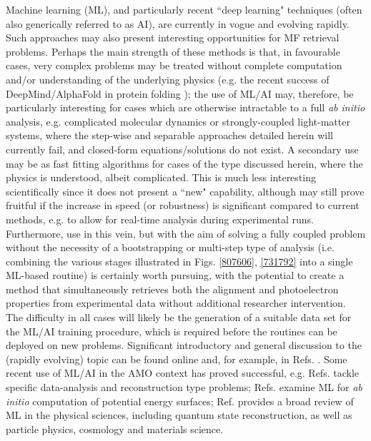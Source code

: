 \documentclass[10pt]{article}
\begin{document}
Machine learning (ML), and particularly recent ``deep learning" techniques (often also generically referred to as AI), are currently in vogue and evolving rapidly. Such approaches may also present interesting opportunities for MF retrieval problems. Perhaps the main strength of these methods is that, in favourable cases, very complex problems may be treated without complete computation and/or understanding of the underlying physics (e.g. the recent success of DeepMind/AlphaFold in protein folding \cite{eisenstein2021ArtificialIntelligencePowers,jumper2021HighlyAccurateProtein}); the use of ML/AI may, therefore, be particularly interesting for cases which are otherwise intractable to a full \textit{ab initio} analysis, e.g. complicated molecular dynamics or strongly-coupled light-matter systems, where the step-wise and separable approaches detailed herein will currently fail, and closed-form equations/solutions do not exist. A secondary use may be as fast fitting algorithms for cases of the type discussed herein, where the physics is understood, albeit complicated. This is much less interesting scientifically since it does not present a ``new" capability, although may still prove fruitful if the increase in speed (or robustness) is significant compared to current methods, e.g. to allow for real-time analysis during experimental runs. Furthermore, use in this vein, but with the aim of solving a fully coupled problem without the necessity of a bootstrapping or multi-step type of analysis (i.e. combining the various stages illustrated in Figs. \ref{807606}, \ref{731792} into a single ML-based routine) is certainly worth pursuing, with the potential to create a method that simultaneously retrieves both the alignment and photoelectron properties from experimental data without additional researcher intervention. The difficulty in all cases will likely be the generation of a suitable data set for the ML/AI training procedure, which is required before the routines can be deployed on new problems. Significant introductory and general discussion to the (rapidly evolving) topic can be found online and, for example, in Refs. \cite{LeCun2015,carleo2019MachineLearningPhysical,davies2021AdvancingMathematicsGuiding}. Some recent use of ML/AI in the AMO context has proved successful, e.g. Refs. \cite{he2022FilmingMoviesAttosecond,hegazy2022BayesianInferencingDeterministic} tackle specific data-analysis and reconstruction type problems; Refs. \cite{lu2022FastInitioPotential,nandi2021DmachineLearningPotential} examine ML for \textit{ab initio} computation of potential energy surfaces; Ref. \cite{carleo2019MachineLearningPhysical} provides a broad review of ML in the physical sciences, including quantum state reconstruction, as well as particle physics, cosmology and materials science.
\end{document}
